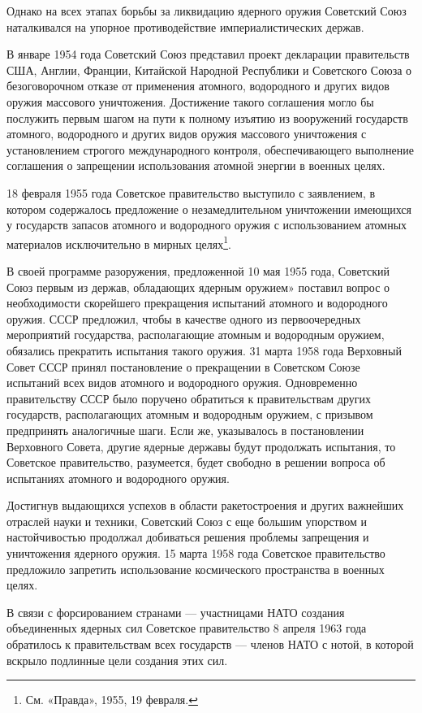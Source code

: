 \documentclass[12pt, a4paper, openany]{book}
\begin{document}
	Однако на всех этапах борьбы за ликвидацию ядерного оружия Советский Союз наталкивался на упорное противодействие империалистических держав.
	
	В январе 1954 года Советский Союз представил проект декларации правительств США, Англии, Франции, Китайской Народной Республики и Советского Союза о безоговорочном отказе от применения атомного, водородного и других видов оружия массового уничтожения. Достижение такого соглашения могло бы послужить первым шагом на пути к полному изъятию из вооружений государств атомного, водородного и других видов оружия массового уничтожения с установлением строгого международного контроля, обеспечивающего выполнение соглашения о запрещении использования атомной энергии в военных целях.
	
	18 февраля 1955 года Советское правительство выступило с заявлением, в котором содержалось предложение о незамедлительном уничтожении имеющихся у государств запасов атомного и водородного оружия с использованием атомных материалов исключительно в мирных целях{\footnote{См. «Правда», 1955, 19 февраля.}}.
	
	
	В своей программе разоружения, предложенной 10 мая 1955 года, Советский Союз первым из держав, обладающих ядерным оружием» поставил вопрос о необходимости скорейшего прекращения испытаний атомного и водородного оружия. СССР предложил, чтобы в качестве одного из первоочередных мероприятий государства, располагающие атомным и водородным оружием, обязались прекратить испытания такого оружия. 31 марта 1958 года Верховный Совет СССР принял постановление о прекращении в Советском Союзе испытаний всех видов атомного и водородного оружия. Одновременно правительству СССР было поручено обратиться к правительствам других государств, располагающих атомным и водородным оружием, с призывом предпринять аналогичные шаги. Если же, указывалось в постановлении Верховного Совета, другие ядерные державы будут продолжать испытания, то Советское правительство, разумеется, будет свободно в решении вопроса об испытаниях атомного и водородного оружия.
	
	Достигнув выдающихся успехов в области ракетостроения и других важнейших отраслей науки и техники, Советский Союз с еще большим упорством и настойчивостью продолжал добиваться решения проблемы запрещения и уничтожения ядерного оружия. 15 марта 1958 года Советское правительство предложило запретить использование космического пространства в военных целях.
	
	В связи с форсированием странами — участницами НАТО создания объединенных ядерных сил Советское правительство 8 апреля 1963 года обратилось к правительствам всех государств — членов НАТО с нотой, в которой вскрыло подлинные цели создания этих сил.
	
\end{document}
